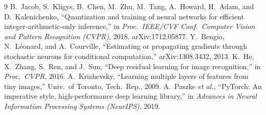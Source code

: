 \documentclass[conference]{IEEEtran}
\begin{document}
\begin{thebibliography}{9}
 B.~Jacob, S.~Kligys, B.~Chen, M.~Zhu, M.~Tang, A.~Howard, H.~Adam, and D.~Kalenichenko, ``Quantization and training of neural networks for efficient integer-arithmetic-only inference,'' in \emph{Proc.\ IEEE/CVF Conf.\ Computer Vision and Pattern Recognition (CVPR)}, 2018. arXiv:1712.05877.
 Y.~Bengio, N.~L\'eonard, and A.~Courville, ``Estimating or propagating gradients through stochastic neurons for conditional computation,'' arXiv:1308.3432, 2013.
 K.~He, X.~Zhang, S.~Ren, and J.~Sun, ``Deep residual learning for image recognition,'' in \emph{Proc.\ CVPR}, 2016.
 A.~Krizhevsky, ``Learning multiple layers of features from tiny images,'' Univ.\ of Toronto, Tech.\ Rep., 2009.
 A.~Paszke \emph{et al.}, ``PyTorch: An imperative style, high-performance deep learning library,'' in \emph{Advances in Neural Information Processing Systems (NeurIPS)}, 2019.
\end{thebibliography}
\end{document}
